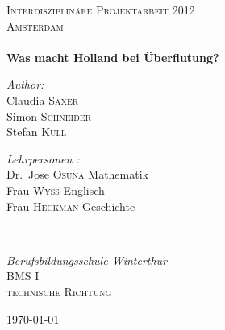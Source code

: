 
\begin{titlepage}

\begin{center}


\textsc{\LARGE Interdisziplinäre Projektarbeit 2012}\\[1.5cm]

\textsc{\Large Amsterdam}\\[0.5cm]

 

\HRule \\[0.4cm] 
{ \huge \bfseries Was macht Holland bei Überflutung?}
\HRule \\[0.4cm] 


\begin{minipage}{0.4\textwidth}
\begin{flushleft} \large
\emph{Author:}
\\Claudia \textsc{Saxer}
\\Simon \textsc{Schneider}
\\Stefan \textsc{Kull}
\end{flushleft}
\end{minipage}
\begin{minipage}{0.5\textwidth}
\begin{flushright} \large
\emph{Lehrpersonen :} 
\\Dr.~Jose \textsc{Osuna}  \textnormal{Mathematik}
\\Frau \textsc{Wyss} \textnormal{Englisch}
\\Frau \textsc{Heckman} \textnormal{Geschichte}
\end{flushright}
\end{minipage}
\\[1.5cm]
\begin{minipage}{0.5\textwidth}
\begin{center} \large
\emph{Berufsbildungsschule Winterthur} 
\\ \textsc{BMS I}
\\ \textsc{technische Richtung }
\end{center}
\end{minipage}

\vfill

{\large \today}

\end{center}


\end{titlepage}


